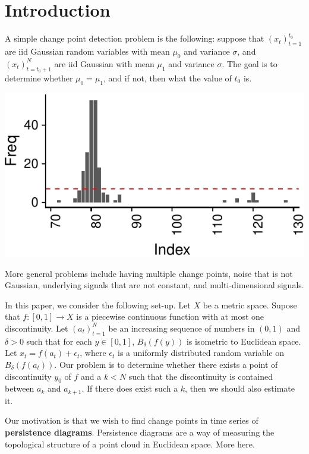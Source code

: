 \documentclass[smallextended]{svjour3}       %
\begin{document}
\section{Introduction}\label{intro}

A simple change point detection problem is the following: suppose that
\((x_t)_{t = 1}^{t_0}\) are iid Gaussian random variables with mean
\(\mu_0\) and variance \(\sigma\), and \((x_t)_{t = t_0 + 1}^N\) are iid
Gaussian with mean \(\mu_1\) and variance \(\sigma\). The goal is to
determine whether \(\mu_0 = \mu_1\), and if not, then what the value of
\(t_0\) is.

\begin{center}\includegraphics{springer_template_files/figure-latex/unnamed-chunk-1-1} \end{center}

More general problems include having multiple change points, noise that
is not Gaussian, underlying signals that are not constant, and
multi-dimensional signals.

In this paper, we consider the following set-up. Let \(X\) be a metric
space. Supose that \(f:[0,1]\to X\) is a piecewise continuous function
with at most one discontinuity. Let \((a_t)_{t = 1}^N\) be an increasing
sequence of numbers in \((0, 1)\) and \(\delta > 0\) such that for each
\(y\in [0,1]\), \(B_\delta(f(y))\) is isometric to Euclidean space. Let
\(x_t = f(a_t) + \epsilon_t\), where \(\epsilon_t\) is a uniformly
distributed random variable on \(B_\delta(f(a_t))\). Our problem is to
determine whether there exists a point of discontinuity \(y_0\) of \(f\)
and a \(k < N\) such that the discontinuity is contained between \(a_k\)
and \(a_{k +1}\). If there does exist such a \(k\), then we should also
estimate it.

Our motivation is that we wish to find change points in time series of
\textbf{persistence diagrams}. Persistence diagrams are a way of
measuring the topological structure of a point cloud in Euclidean space.
More here.
\end{document}
